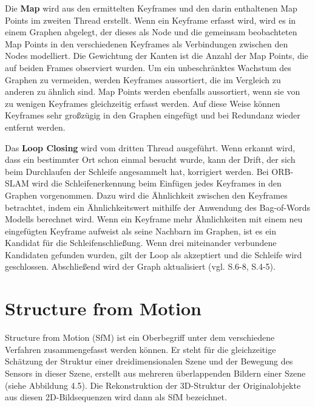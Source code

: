 Die \textbf{Map} wird aus den ermittelten Keyframes und den darin enthaltenen Map Points im zweiten Thread erstellt. Wenn ein Keyframe erfasst wird, wird es in einem Graphen abgelegt, der dieses als Node und die gemeinsam beobachteten Map Points in den verschiedenen Keyframes als Verbindungen zwischen den Nodes modelliert. Die Gewichtung der Kanten ist die Anzahl der Map Points, die auf beiden Frames observiert wurden. Um ein unbeschränktes Wachstum des Graphen zu vermeiden, werden Keyframes aussortiert, die im Vergleich zu anderen zu ähnlich sind. Map Points werden ebenfalls aussortiert, wenn sie von zu wenigen Keyframes gleichzeitig erfasst werden. Auf diese Weise können Keyframes sehr großzügig in den Graphen eingefügt und bei Redundanz wieder entfernt werden.

Das \textbf{Loop Closing} wird vom dritten Thread ausgeführt. Wenn erkannt wird, dass ein bestimmter Ort schon einmal besucht wurde, kann der Drift, der sich beim Durchlaufen der Schleife angesammelt hat, korrigiert werden. Bei ORB-SLAM wird die Schleifenerkennung beim Einfügen jedes Keyframes in den Graphen vorgenommen. Dazu wird die Ähnlichkeit zwischen den Keyframes betrachtet, indem ein Ähnlichkeitswert mithilfe der Anwendung des \glqq Bag-of-Words\grqq{} Modells berechnet wird. Wenn ein Keyframe mehr Ähnlichkeiten mit einem neu eingefügten Keyframe aufweist als seine Nachbarn im Graphen, ist es ein Kandidat für die Schleifenschließung. Wenn drei miteinander verbundene Kandidaten gefunden wurden, gilt der Loop als akzeptiert und die Schleife wird geschlossen. Abschließend wird der Graph aktualisiert (vgl. \cite{orbslam_og} S.6-8, \cite{orb_slam} S.4-5).


\section{Structure from Motion}

Structure from Motion (SfM) ist ein Oberbegriff unter dem verschiedene Verfahren zusammengefasst werden können. Er steht für die gleichzeitige Schätzung der Struktur einer dreidimensionalen Szene und der Bewegung des Sensors in dieser Szene, erstellt aus mehreren überlappenden Bildern einer Szene (siehe Abbildung 4.5). Die Rekonstruktion der 3D-Struktur der Originalobjekte aus diesen 2D-Bildsequenzen wird dann als SfM bezeichnet. 

